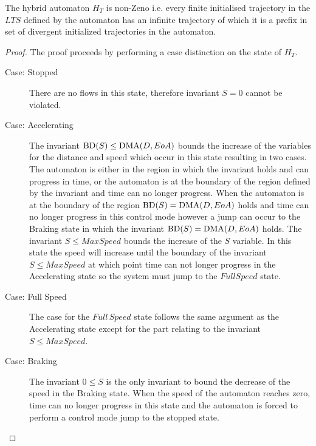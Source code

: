 \begin{mytheorem}
The hybrid automaton  $H_{T}$ is non-Zeno i.e. every finite initialised trajectory in the $LTS$ defined by the automaton has an infinite trajectory of which it is a prefix in set of divergent initialized trajectories in the automaton.
\begin{proof}
The proof proceeds by performing a case distinction on the state of $H_{T}$.
\begin{description}
\item[Case: Stopped] There are no flows in this state, therefore invariant $S = 0$ cannot be violated.


\item[Case: Accelerating] The invariant $\mathrm{BD}(S) \leq \mathrm{DMA}(D,EoA)$ bounds the increase of the variables for the distance and speed which occur in this state resulting in two cases. The automaton is either in the region in which the invariant holds and can progress in time, or the automaton is at the boundary of the region defined by the invariant and time can no longer progress. When the automaton is at the boundary of the region $\mathrm{BD}(S) = \mathrm{DMA}(D,EoA)$ holds and time can no longer progress in this control mode however a jump can occur to the Braking state in which the invariant $\mathrm{BD}(S) = \mathrm{DMA}(D,EoA)$ holds. The invariant $S \leq MaxSpeed$ bounds the increase of the $S$ variable. In this state the speed will increase until the boundary of the invariant $S \leq MaxSpeed$ at which point time can not longer progress in the Accelerating state so the system must jump to the $Full Speed$ state.


\item[Case: Full Speed] 
The case for the $Full \, Speed$ state follows the same argument as the Accelerating state except for the part relating to the invariant $S \leq MaxSpeed$.

\item[Case: Braking]
The invariant $0 \leq S$ is the only invariant to bound the decrease of the speed in the Braking state. When the speed of  the automaton reaches zero, time can no longer progress in this state and the automaton is forced to perform a control mode jump to the stopped state.
\end{description}
\end{proof}
\end{mytheorem}





